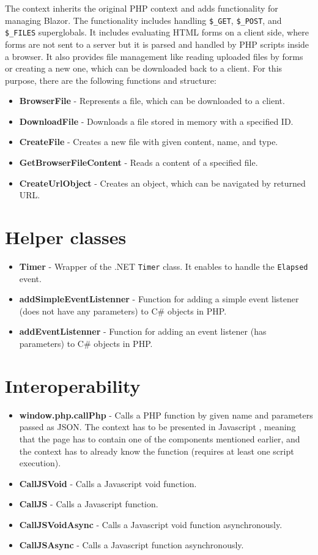 The context inherits the original PHP context and adds functionality for managing Blazor. The  functionality includes handling \texttt{\$\_GET}, \texttt{\$\_POST}, and \texttt{\$\_FILES} superglobals. It includes evaluating HTML forms on a client side, where forms are not sent to a server but it is parsed and handled by PHP scripts inside a browser. It also provides file management like reading uploaded files by forms or creating a new one, which can be downloaded back to a client.  For this purpose, there are the following functions and structure:
\par
\begin{itemize}
\item \textbf{BrowserFile} - Represents a file, which can be downloaded to a client.
\item \textbf{DownloadFile} - Downloads a file stored in memory with a specified ID.
\item \textbf{CreateFile} - Creates a new file with given content, name, and type.
\item \textbf{GetBrowserFileContent} - Reads a content of a specified file.
\item \textbf{CreateUrlObject} - Creates an object, which can be navigated by returned URL.
\end{itemize}

\section{Helper classes}

\begin{itemize}
\item \textbf{Timer} - Wrapper of the .NET \texttt{Timer} class. It enables to handle the \texttt{Elapsed} event.
\item \textbf{addSimpleEventListenner} - Function for adding a simple event listener (does not have any parameters) to C\# objects in PHP.
\item \textbf{addEventListenner} - Function for adding an event listener (has parameters) to C\# objects in PHP.
\end{itemize}

\section{Interoperability}

\begin{itemize}
\item \textbf{window.php.callPhp} - Calls a PHP function by given name and parameters passed as JSON. The context has to be presented in Javascript , meaning that the page has to contain one of the components mentioned earlier, and the context has to already know the function (requires at least one script execution).
\item \textbf{CallJSVoid} - Calls a Javascript void function.
\item \textbf{CallJS} - Calls a Javascript function.
\item \textbf{CallJSVoidAsync} - Calls a Javascript void function asynchronously.
\item \textbf{CallJSAsync} - Calls a Javascript function asynchronously.
\end{itemize}
